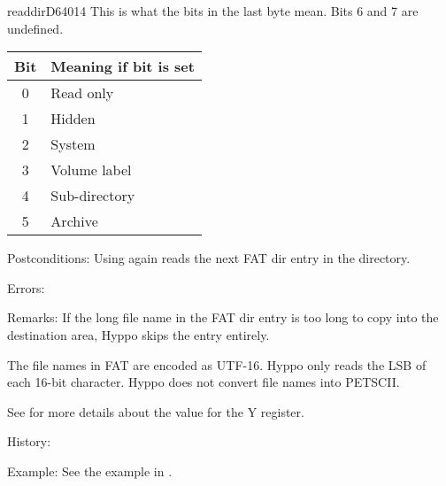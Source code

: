 \begin{hyppotrap}{readdir}{D640}{14}
  This is what the bits in the last byte mean. Bits 6 and 7 are undefined.
  {\setlength{\tabcolsep}{2mm}
  \begin{tabular}{|c|l|}
  \hline
  \textbf{Bit} & \textbf{Meaning if bit is set} \\
  \hline
  0 & Read only         \\
  1 & Hidden            \\
  2 & System            \\
  3 & Volume label      \\
  4 & Sub-directory     \\
  5 & Archive           \\
  \hline
  \end{tabular}
  }
\item [Postconditions:]
  Using  again reads the next FAT dir entry in the directory.
\item [Errors:]
\item [Remarks:]
  If the long file name in the FAT dir entry is too long to copy into the
  destination area, Hyppo skips the entry entirely.

  The file names in FAT are encoded as UTF-16. Hyppo only reads the LSB
  of each 16-bit character. Hyppo does not convert file names into
  PETSCII.

  See  for more details about the value for the
  Y register.
\item [History:]
\item [Example:]
  See the example in .
\end{hyppotrap}


